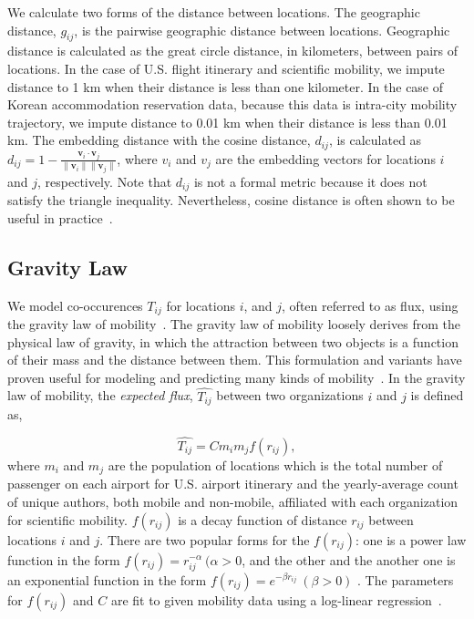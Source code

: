 \documentclass[12pt]{article} %
\begin{document}
We calculate two forms of the distance between locations.
The geographic distance, $g_{ij}$, is the pairwise geographic distance between locations.
Geographic distance is calculated as the great circle distance, in kilometers, between pairs of locations.
In the case of U.S. flight itinerary and scientific mobility, we impute distance to 1 km when their distance is less than one kilometer. In the case of Korean accommodation reservation data, because this data is intra-city mobility trajectory, we impute distance to 0.01 km when their distance is less than 0.01 km. The embedding distance with the cosine distance, $d_{ij}$, is calculated as $d_{ij} = 1 - \frac{\bm{v}_{i} \cdot \bm{v}_{j}}{\lVert \bm{v}_{i} \rVert \lVert \bm{v}_{j} \rVert}$,
where $v_i$ and $v_j$ are the embedding vectors for locations $i$ and $j$, respectively.
Note that $d_{ij}$ is not a formal metric because it does not satisfy the triangle inequality.
Nevertheless, cosine distance is often shown to be useful in practice~\autocite{lerman2007embedding, brown1970migration, kim2018functional}. 



%
%
\subsection*{Gravity Law}

We model co-occurences $T_{ij}$ for locations $i$, and $j$, often referred to as flux, using the gravity law of mobility~\autocite{zipf1946gravity}.
The gravity law of mobility loosely derives from the physical law of gravity, in which the attraction between two objects is a function of their mass and the distance between them.
This formulation and variants have proven useful for modeling and predicting many kinds of mobility~\autocite{jung2008highwaygravity, curiel2018citygravity, truscott2012epidemicgravity, hong2016busgravity}.
In the gravity law of mobility, the \textit{expected flux}, $\hat{T_{ij}}$ between two organizations $i$ and $j$ is defined as,

%
%
\begin{equation}
	\label{eq:gravity_basic}
	\hat{T_{ij}} = Cm_{i}m_{j}f(r_{ij}),
\end{equation}
where $m_{i}$ and $m_{j}$ are the population of locations which is the total number of passenger on each airport for U.S. airport itinerary and the yearly-average count of unique authors, both mobile and non-mobile, affiliated with each organization for scientific mobility.  $f(r_{ij})$ is a decay function of distance $r_{ij}$ between locations $i$ and $j$. 
There are two popular forms for the $f(r_{ij})$:
one is a power law function in the form $f(r_{ij})= r^{-\alpha}_{ij} \ (\alpha > 0$, and the other and the another one is an exponential function in the form $f(r_{ij}) = e^{-\beta r_{ij}} \ (\beta > 0)$ \autocite{chen2015distance}.  
The parameters for $f(r_{ij})$ and $C$ are fit to given mobility data using a log-linear regression~\autocite{jung2008highwaygravity, curiel2018citygravity, truscott2012epidemicgravity, hong2016busgravity, simini2012universal}.
\end{document}

